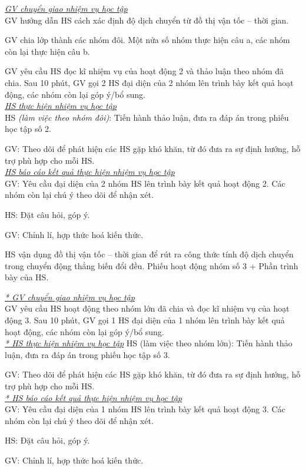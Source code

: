 {
\textit{\underline{GV chuyển giao nhiệm vụ học tập}}\\
GV hướng dẫn HS cách xác định độ dịch chuyển từ đồ thị vận tốc – thời gian.

GV chia lớp thành các nhóm đôi. Một nửa số nhóm thực hiện câu a, các nhóm còn lại thực hiện câu b. 

GV yêu cầu HS đọc kĩ nhiệm vụ của hoạt động 2 và thảo luận theo nhóm đã chia. Sau 10 phút, GV gọi 2 HS đại diện của 2 nhóm lên trình bày kết quả hoạt động, các nhóm còn lại góp ý/bổ sung.\\
\textit{\underline{HS thực hiện nhiệm vụ học tập}}\\
HS \textit{(làm việc theo nhóm đôi)}: Tiến hành thảo luận, đưa ra đáp án trong phiếu học tập số 2. 

GV: Theo dõi để phát hiện các HS gặp khó khăn, từ đó đưa ra sự định hướng, hỗ trợ phù hợp cho mỗi HS.\\
\textit{\underline{HS báo cáo kết quả thực hiện nhiệm vụ học tập}}\\
GV: Yêu cầu đại diện của 2 nhóm HS lên trình bày kết quả hoạt động 2. Các nhóm còn lại chú ý theo dõi để nhận xét.

HS: Đặt câu hỏi, góp ý.

GV: Chỉnh lí, hợp thức hoá kiến thức.


}
{
HS vận dụng đồ thị vận tốc – thời gian để rút ra công thức tính độ dịch chuyển trong chuyển động thẳng biến đổi đều.
}
{
	Phiếu hoạt động nhóm số 3 + Phần trình bày của HS.
}
{
\textit{\underline{* GV chuyển giao nhiệm vụ học tập}}\\
GV yêu cầu HS hoạt động theo nhóm lớn đã chia và đọc kĩ nhiệm vụ của hoạt động 3. Sau 10 phút, GV gọi 1 HS đại diện của 1 nhóm lên trình bày kết quả hoạt động, các nhóm còn lại góp ý/bổ sung.\\
\textit{\underline{* HS thực hiện nhiệm vụ học tập}}
HS (làm việc theo nhóm lớn): Tiến hành thảo luận, đưa ra đáp án trong phiếu học tập số 3. 

GV: Theo dõi để phát hiện các HS gặp khó khăn, từ đó đưa ra sự định hướng, hỗ trợ phù hợp cho mỗi HS.\\
\textit{\underline{* HS báo cáo kết quả thực hiện nhiệm vụ học tập}}\\
GV: Yêu cầu đại diện của 1 nhóm HS lên trình bày kết quả hoạt động 3. Các nhóm còn lại chú ý theo dõi để nhận xét.

HS: Đặt câu hỏi, góp ý.

GV: Chỉnh lí, hợp thức hoá kiến thức.
}
